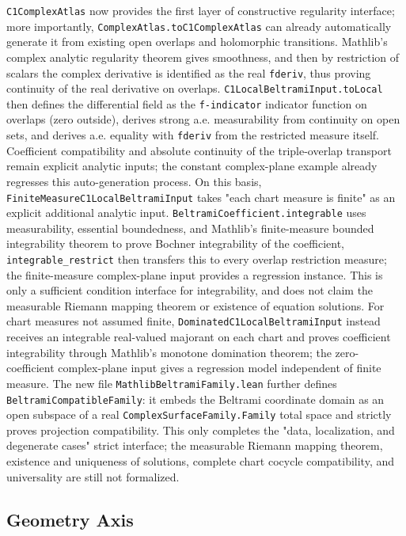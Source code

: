 \documentclass[UTF8,a4paper,11pt]{article}
\begin{document}
\texttt{C1ComplexAtlas} now provides the first layer of constructive regularity interface; more importantly,
\texttt{ComplexAtlas.toC1ComplexAtlas} can already automatically generate it from existing open overlaps and holomorphic transitions.
Mathlib's complex analytic regularity theorem gives smoothness, and then by restriction of scalars the complex derivative is identified as the real \texttt{fderiv}, thus proving continuity of the real derivative on overlaps.
\texttt{C1LocalBeltramiInput.toLocal} then defines the differential field as the \texttt{f-indicator} indicator function on overlaps (zero outside), derives strong a.e. measurability from continuity on open sets, and derives a.e. equality with \texttt{fderiv} from the restricted measure itself.
Coefficient compatibility and absolute continuity of the triple-overlap transport remain explicit analytic inputs;
the constant complex-plane example already regresses this auto-generation process.
On this basis, \texttt{FiniteMeasureC1LocalBeltramiInput} takes "each chart measure is finite" as an explicit additional analytic input.
\texttt{BeltramiCoefficient.integrable} uses measurability, essential boundedness, and Mathlib's finite-measure bounded integrability theorem to prove Bochner integrability of the coefficient,
\texttt{integrable\_restrict} then transfers this to every overlap restriction measure;
the finite-measure complex-plane input provides a regression instance.
This is only a sufficient condition interface for integrability, and does not claim the measurable Riemann mapping theorem or existence of equation solutions.
For chart measures not assumed finite, \texttt{DominatedC1LocalBeltramiInput} instead receives an integrable real-valued majorant on each chart and proves coefficient integrability through Mathlib's monotone domination theorem;
the zero-coefficient complex-plane input gives a regression model independent of finite measure.
The new file \texttt{MathlibBeltramiFamily}\allowbreak\texttt{.lean} further defines
\texttt{BeltramiCompatibleFamily}: it embeds the Beltrami coordinate domain as an open subspace of a real
\texttt{ComplexSurfaceFamily.Family} total space and strictly proves projection compatibility.
This only completes the "data, localization, and degenerate cases" strict interface;
the measurable Riemann mapping theorem, existence and uniqueness of solutions, complete chart cocycle compatibility, and universality are still not formalized.

\subsection{Geometry Axis}
\end{document}
